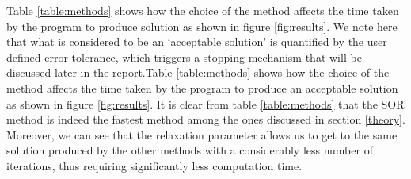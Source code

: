 \documentclass[a4paper]{article}
\begin{document}
Table \ref{table:methods} shows how the choice of the method affects the time 
taken by the program to produce solution as shown in figure \ref{fig:results}. 
We note here that what is considered to be an `acceptable solution' is quantified 
by the user defined error tolerance, which triggers a stopping mechanism that 
will be discussed later in the report.Table \ref{table:methods} shows how the 
choice of the method affects the time taken by the program to produce an 
acceptable solution as shown in figure \ref{fig:results}. It is clear from 
table \ref{table:methods} that the SOR method is indeed the fastest method 
among the ones discussed in section \ref{theory}. Moreover, we can see that the 
relaxation parameter allows us to get to the same solution produced by the 
other methods with a considerably less number of iterations, thus requiring 
significantly less computation time.
\end{document}
